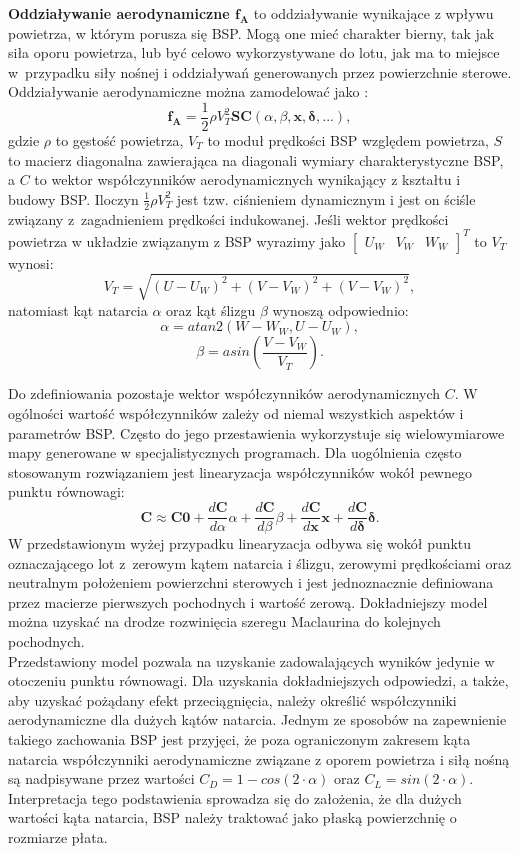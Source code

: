\textbf{Oddziaływanie aerodynamiczne $\bm{f_A}$} to oddziaływanie wynikające z wpływu powietrza, w którym porusza się BSP. Mogą one mieć charakter bierny, tak jak siła oporu powietrza, lub być celowo wykorzystywane do lotu, jak ma to miejsce w~przypadku siły nośnej i oddziaływań generowanych przez powierzchnie sterowe. Oddziaływanie aerodynamiczne można zamodelować jako \cite{solar_plane}:
\[
	\bm{f_A} = \frac{1}{2}\rho V_{T}^2  \bm{S} \bm{C}\left(\alpha, \beta, \bm{x}, \bm{\delta}, ... \right),
\]
gdzie $\rho$ to gęstość powietrza, $V_T$ to moduł prędkości BSP względem powietrza, $S$ to macierz diagonalna zawierająca na diagonali wymiary charakterystyczne BSP, a $C$ to wektor współczynników aerodynamicznych wynikający z kształtu i budowy BSP. Iloczyn $\frac{1}{2}\rho V_{T}^2$ jest tzw. ciśnieniem dynamicznym i jest on ściśle związany z~zagadnieniem prędkości indukowanej. Jeśli wektor prędkości powietrza w układzie związanym z BSP wyrazimy jako $ \begin{bmatrix} U_W & V_W & W_W\end{bmatrix}^T$ to $V_T$ wynosi:
\[
	V_T = \sqrt{(U-U_W)^2 + (V-V_W)^2 + (V-V_W)^2},
\]
natomiast kąt natarcia $\alpha$ oraz kąt ślizgu $\beta$ wynoszą odpowiednio:
\[
	\alpha = atan2 \left( W - W_W, U - U_W \right),
\]
\[
	\beta = asin \left( \frac{V-V_W}{V_T} \right).
\]

Do zdefiniowania pozostaje wektor współczynników aerodynamicznych $C$. W ogólności wartość współczynników zależy od niemal wszystkich aspektów i parametrów BSP. Często do jego przestawienia wykorzystuje się wielowymiarowe mapy generowane w specjalistycznych programach. Dla uogólnienia często stosowanym rozwiązaniem jest linearyzacja współczynników wokół pewnego punktu równowagi:
\[
\bm{C} \approx \bm{C0} + \frac{d\bm{C}}{d\alpha}\alpha + \frac{d\bm{C}}{d\beta}\beta + \frac{d\bm{C}}{d\bm{x}}\bm{x} + \frac{d\bm{C}}{d\bm{\delta}}\bm{\delta}.
\]
W przedstawionym wyżej przypadku linearyzacja odbywa się wokół punktu oznaczającego lot z~zerowym kątem natarcia i ślizgu, zerowymi prędkościami oraz neutralnym położeniem powierzchni sterowych i jest jednoznacznie definiowana przez macierze pierwszych pochodnych i wartość zerową. Dokładniejszy model można uzyskać na drodze rozwinięcia szeregu Maclaurina do kolejnych pochodnych.\\

Przedstawiony model pozwala na uzyskanie zadowalających wyników jedynie w otoczeniu punktu równowagi. Dla uzyskania dokładniejszych odpowiedzi, a także, aby uzyskać pożądany efekt przeciągnięcia, należy określić współczynniki aerodynamiczne dla dużych kątów natarcia. Jednym ze sposobów na zapewnienie takiego zachowania BSP jest przyjęci, że poza ograniczonym zakresem kąta natarcia współczynniki aerodynamiczne związane z oporem powietrza i siłą nośną są nadpisywane przez wartości $C_D = 1 - cos(2 \cdot \alpha)$ oraz $C_L = sin(2 \cdot \alpha)$. Interpretacja tego podstawienia sprowadza się do założenia, że dla dużych wartości kąta natarcia, BSP należy traktować jako płaską powierzchnię o rozmiarze płata.\\


